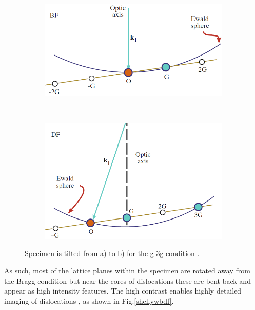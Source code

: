 \begin{figure}[h]
	\begin{subfigure}[t]{0.5\textwidth}
		\centering
		\includegraphics[width = 1\textwidth]{Figs/Ch2/w1.png}
		\caption{}
	\end{subfigure}%
	\hspace*{1cm}
	~	
	\begin{subfigure}[t]{0.44\textwidth}
		\centering
		\includegraphics[width=1\textwidth]{Figs/Ch2/w2.png}
		\caption{}
	\end{subfigure}
	\caption {Specimen is tilted from a) to b) for the g-3g condition \cite{DavidB.Williams2009}.}
	\label{wbdf}
\end{figure}
\FloatBarrier 


As such, most of the lattice planes within the specimen are rotated away from the Bragg condition but near the cores of dislocations these are bent back and appear as high intensity features. The high contrast enables highly detailed imaging of dislocations \cite{DavidB.Williams2009}, as shown in Fig.\ref{shellywbdf}.

